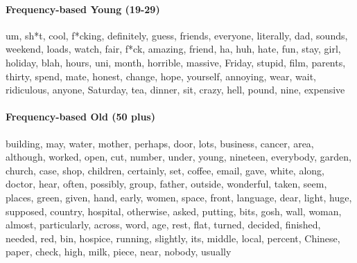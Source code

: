 \paragraph{Frequency-based Young (19-29)} um,
sh*t, cool, f*cking, definitely, guess, friends, everyone, literally, dad, sounds, weekend, loads, watch, fair, f*ck, amazing, friend, ha, huh, hate, fun, stay, girl, holiday, blah, hours, uni, month, horrible, massive, Friday, stupid, film, parents, thirty, spend, mate, honest, change, hope, yourself, annoying, wear, wait, ridiculous, anyone, Saturday, tea, dinner, sit, crazy, hell, pound, nine, expensive

\paragraph{Frequency-based Old (50 plus)} building, may, water, mother, perhaps, door, lots, business, cancer, area, although, worked, open, cut, number, under, young, nineteen, everybody, garden, church, case, shop, children, certainly, set, coffee, email, gave, white, along, doctor, hear, often, possibly, group, father, outside, wonderful, taken, seem, places, green, given, hand, early, women, space, front, language, dear, light, huge, supposed, country, hospital, otherwise, asked, putting, bits, gosh, wall, woman, almost, particularly, across, word, age, rest, flat, turned, decided, finished, needed, red, bin, hospice, running, slightly, its, middle, local, percent, Chinese, paper, check, high, milk, piece, near, nobody, usually


